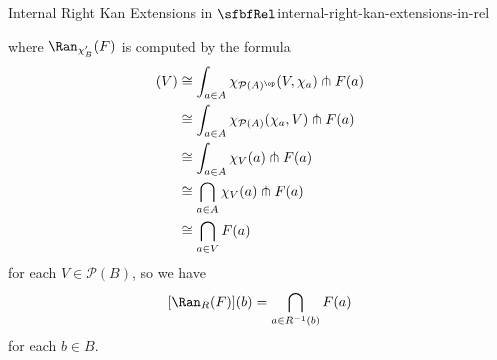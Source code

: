 \begin{proposition}{Internal Right Kan Extensions in $\sfbfRel$}{internal-right-kan-extensions-in-rel}
\begin{enumerate}
\begin{webcompile}
%
            \end{webcompile}
            where $\Ran_{\chi'_{B}}(F)$ is computed by the formula
            \begin{align*}
                [\Ran_{\chi'_{A}}(F)](V) &\cong \int_{a\in A}\chi_{\mathcal{P}(A)^{\op}}(V,\chi_{a})\pitchfork F(a)\\
                                         &\cong \int_{a\in A}\chi_{\mathcal{P}(A)}(\chi_{a},V)\pitchfork F(a)\\
                                         &\cong \int_{a\in A}\chi_{V}(a)\pitchfork F(a)\\
                                         &\cong \bigcap_{a\in A}\chi_{V}(a)\pitchfork F(a)\\
                                         &\cong \bigcap_{a\in V}F(a)
            \end{align*}
            for each $V\in\mathcal{P}(B)$, so we have%
            \[
                [\Ran_{R}(F)](b)%
                =%
                \bigcap_{a\in R^{-1}(b)}F(a)%
            \]%
            for each $b\in B$.
    \end{enumerate}
\end{proposition}
